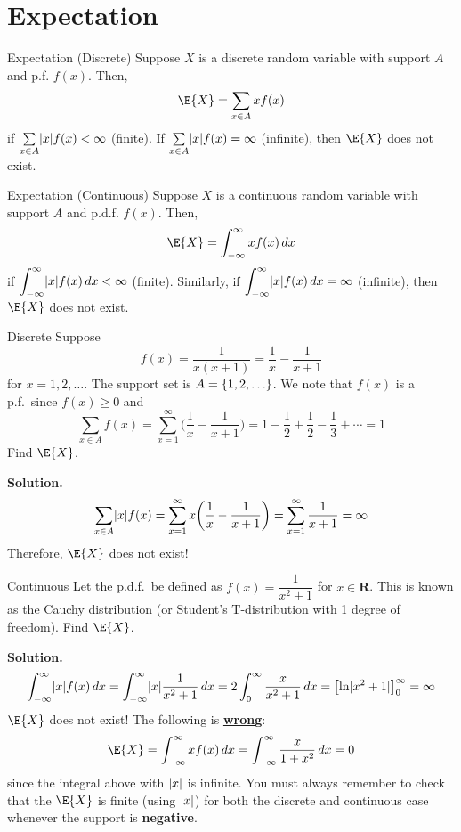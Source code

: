 \section{Expectation}
\begin{Definition}{Expectation (Discrete)}{}
    Suppose $ X $ is a discrete random variable with support
    $ A $ and p.f. $ f(x) $. Then,
    \[ \E{X}=\sum\limits_{x\in A}x f(x)  \]
    if $ \sum\limits_{x\in A}\lvert x\rvert f(x) < \infty $ (finite).
    If $ \sum\limits_{x\in A}\lvert x\rvert f(x) =\infty $ (infinite), then
    $ \E{X} $ does not exist.
\end{Definition}

\begin{Definition}{Expectation (Continuous)}{}
    Suppose $ X $ is a continuous random variable with support $ A $
    and p.d.f. $ f(x) $. Then,
    \[ \E{X}=\int_{-\infty}^{\infty} x f(x)\, d{x}  \]
    if $ \displaystyle \int_{-\infty}^{\infty} \lvert x\rvert f(x)\, d{x} <\infty $
    (finite). Similarly,
    if $ \displaystyle \int_{-\infty}^{\infty} \lvert x\rvert f(x)\, d{x} =\infty $
    (infinite),
    then $ \E{X} $ does not exist.
\end{Definition}

\begin{Example}{Discrete}{}
    Suppose
    \[ f(x)=\frac{1}{x(x+1)}=\frac{1}{x} -\frac{1}{x+1}  \]
    for $ x=1,2,\ldots $. The support set is $ A=\{1,2,\ldots\} $.
    We note that $ f(x) $ is a p.f.\ since
    $ f(x)\ge 0 $ and
    \[ \sum\limits_{x\in A}f(x)=\sum\limits_{x=1}^{\infty}
        \biggl(\frac{1}{x} -\frac{1}{x+1} \biggr)=
        1-\frac{1}{2} +\frac{1}{2} -\frac{1}{3} +\cdots=1  \]
    Find $ \E{X} $.

    \textbf{Solution.}
    \[ \sum\limits_{x\in A}\lvert x\rvert f(x)=\sum\limits_{x=1}^{\infty}
        x\biggl( \frac{1}{x} -\frac{1}{x+1} \biggr)
        =\sum\limits_{x=1}^{\infty} \frac{1}{x+1} =\infty  \]
    Therefore, $ \E{X} $ does not exist!
\end{Example}

\begin{Example}{Continuous}{}
    Let the p.d.f.\ be defined as $ f(x)=\dfrac{1}{x^2+1} $ for
    $ x\in\mathbf{R} $. This is known as the Cauchy distribution
    (or Student's T-distribution with 1 degree of freedom). Find $ \E{X} $.

    \textbf{Solution.}
    \[ \int_{-\infty}^{\infty} \lvert x\rvert f(x)\, d{x} =
        \int_{-\infty}^{\infty} \lvert x\rvert\frac{1}{x^2+1} \, d{x}=
        2 \int_{0}^{\infty} \frac{x}{x^2+1} \, d{x} =
        \bigl[\ln\lvert x^2+1\rvert\bigr]_0^\infty=\infty \]
    $ \E{X} $ does not exist! The following is \underline{\textbf{wrong}}:
    \[ \E{X}=\int_{-\infty}^{\infty}x f(x)\, d{x}=
        \int_{-\infty}^{\infty} \frac{x}{1+x^2} \, d{x}=0  \]
    since the integral above with $ \lvert x\rvert $ is infinite. You must
    always remember to check that the $ \E{X} $ is finite
    (using $ \lvert x\rvert $) for both the discrete and continuous case
    whenever the support is \textbf{negative}.
\end{Example}

